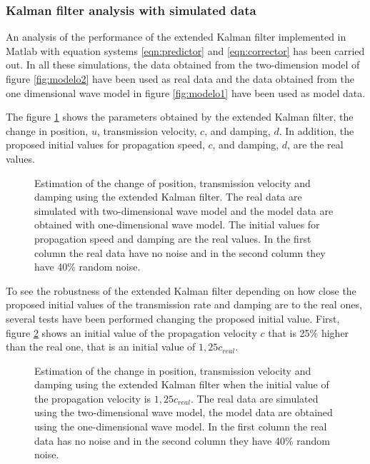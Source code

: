 \documentclass[12pt, a4paper]{article} %
\begin{document}
\newpage

\setlength{\parskip}{0mm}

\subsubsection{Kalman filter analysis with simulated data}

An analysis of the performance of the extended Kalman filter implemented in Matlab with equation systems \ref{eqn:predictor} and \ref{eqn:corrector} has been carried out. In all these simulations, the data obtained from the two-dimension model of figure \ref{fig:modelo2} have been used as real data and the data obtained from the one dimensional wave model in figure \ref{fig:modelo1} have been used as model data.

\setlength{\parskip}{4mm}

The figure \ref{fig:kalman1} shows the parameters obtained by the extended Kalman filter, the change in position, $u$, transmission velocity, $c$, and damping, $d$. In addition, the proposed initial values for propagation speed, $c$, and damping, $d$, are the real values.

\begin{figure}[h!]
    \centering
    
    \caption{Estimation of the change of position, transmission velocity and damping using the extended Kalman filter. The real data are simulated with two-dimensional wave model and the model data are obtained with one-dimensional wave model. The initial values for propagation speed and damping are the real values. In the first column the real data have no noise and in the second column they have 40\% random noise.}
    \label{fig:kalman1}
\end{figure}

To see the robustness of the extended Kalman filter depending on how close the proposed initial values of the transmission rate and damping are to the real ones, several tests have been performed changing the proposed initial value.  
First, figure \ref{fig:kalman1c} shows an initial value of the propagation velocity $c$ that is 25\% higher than the real one, that is an initial value of $1,25 c_{real}$.

\begin{figure}[h!]
    \centering
    
    \caption{Estimation of the change in position, transmission velocity and damping using the extended Kalman filter when the initial value of the propagation velocity is $1,25 c_{real}$. The real data are simulated using the two-dimensional wave model, the model data are obtained using the one-dimensional wave model. In the first column the real data has no noise and in the second column they have 40\% random noise.}
    \label{fig:kalman1c}
\end{figure}
\end{document}
